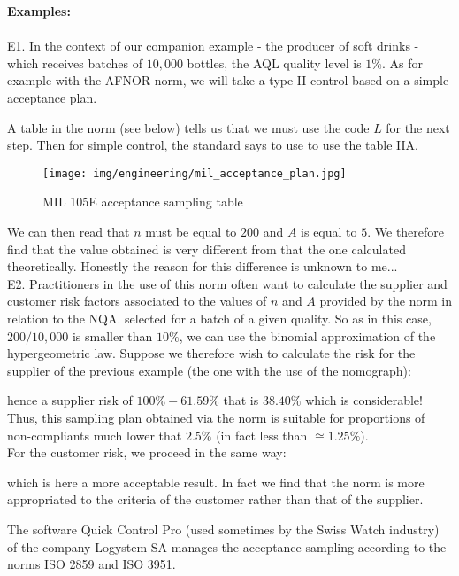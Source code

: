 	\begin{tcolorbox}[colframe=black,colback=white,sharp corners]
	\textbf{{\Large {}}Examples:}\\\\
	E1. In the context of our companion example - the producer of soft drinks - which receives batches of $10,000$ bottles, the AQL quality level is $1\%$. As for example with the AFNOR norm, we will take a type II control based on a simple acceptance plan.

	A table in the norm (see below) tells us that we must use the code $L$ for the next step. Then for simple control, the standard says to use to use the table IIA.
	\begin{figure}[H]
		\centering
		\texttt{[image: img/engineering/mil\_acceptance\_plan.jpg]}
		\caption{MIL 105E acceptance sampling table}	
	\end{figure}
	We can then read that $n$ must be equal to $200$ and $A$ is equal to $5$. We therefore find that the value obtained is very different from that the one calculated theoretically. Honestly the reason for this difference is unknown to me...\\

	E2. Practitioners in the use of this norm often want to calculate the supplier and customer risk factors associated to the values of $n$ and $A$ provided by the norm in relation to the NQA. selected for a batch of a given quality. So as in this case, $200/10,000$ is smaller than $10\%$, we can use the binomial approximation of the hypergeometric law. Suppose we therefore wish to calculate the risk for the supplier of the previous example (the one with the use of the nomograph):
	
	\end{tcolorbox}
	
	\begin{tcolorbox}[colframe=black,colback=white,sharp corners]
	hence a supplier risk of $100\% -61.59\%$ that is $38.40\%$ which is considerable! Thus, this sampling plan obtained via the norm is suitable for proportions of non-compliants much lower that $2.5\%$ (in fact less than $\cong 1.25\%$).\\
	
	For the customer risk, we proceed in the same way:
	
	which is here a more acceptable result. In fact we find that the norm is more appropriated to the criteria of the customer rather than that of the supplier.
	\end{tcolorbox}
	\begin{tcolorbox}[title=Remark,colframe=black,arc=10pt]
	The software Quick Control Pro (used sometimes by the Swiss Watch industry) of the company Logystem SA manages the acceptance sampling according to the norms ISO 2859 and ISO 3951.
	\end{tcolorbox}
	
